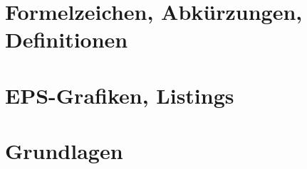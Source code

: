 






\setcounter{secnumdepth}{2}
\tableofcontents

\chapter{Formelzeichen, Abkürzungen, Definitionen}


\chapter{EPS-Grafiken, Listings}


\chapter{Grundlagen}



\listoffigures
\listoftables





\appendix















